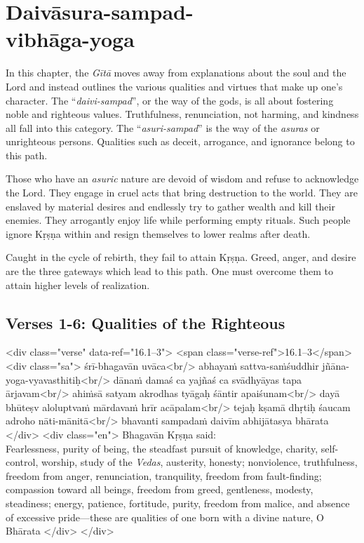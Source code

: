 \chapter{Daivāsura-sampad-\\vibhāga-yoga}\label{chap-daivasura-sampad-vibhaga-yoga}
\noindent In this chapter, the \textit{Gītā} moves away from explanations about the soul and the Lord and instead outlines the various qualities and virtues that make up one’s character. The \enquote{\textit{daivi-sampad}}, or the way of the gods, is all about fostering noble and righteous values. Truthfulness, renunciation, not harming, and kindness all fall into this category. The \enquote{\textit{asuri-sampad}} is the way of the \textit{asuras} or unrighteous persons. Qualities such as deceit, arrogance, and ignorance belong to this path.

Those who have an \textit{asuric} nature are devoid of wisdom and refuse to acknowledge the Lord. They engage in cruel acts that bring destruction to the world. They are enslaved by material desires and endlessly try to gather wealth and kill their enemies. They arrogantly enjoy life while performing empty rituals. Such people ignore Kṛṣṇa within and resign themselves to lower realms after death.

Caught in the cycle of rebirth, they fail to attain Kṛṣṇa. Greed, anger, and desire are the three gateways which lead to this path. One must overcome them to attain higher levels of realization.

\section{Verses 1-6: Qualities of the Righteous}\label{sec-verses-1-6-qualities-of-the-righteous}


\begin{html}
<div class="verse" data-ref="16.1–3">
  <span class="verse-ref">16.1–3</span>
  <div class="sa">
    śrī-bhagavān uvāca<br/>
    abhayaṁ sattva-saṁśuddhir jñāna-yoga-vyavasthitiḥ<br/>
    dānaṁ damaś ca yajñaś ca svādhyāyas tapa ārjavam<br/>
    ahiṁsā satyam akrodhas tyāgaḥ śāntir apaiśunam<br/>
    dayā bhūteṣv aloluptvaṁ mārdavaṁ hrīr acāpalam<br/>
    tejaḥ kṣamā dhṛtiḥ śaucam adroho nāti-mānitā<br/>
    bhavanti sampadaṁ daivīm abhijātasya bhārata
  </div>
  <div class="en">
    \hspace*{1em}Bhagavān Kṛṣṇa said: \\ Fearlessness, purity of being, the steadfast pursuit of knowledge, charity, self-control, worship, study of the \textit{Vedas}, austerity, honesty; nonviolence, truthfulness, freedom from anger, renunciation, tranquility, freedom from fault-finding; compassion toward all beings, freedom from greed, gentleness, modesty, steadiness; energy, patience, fortitude, purity, freedom from malice, and absence of excessive pride---these are qualities of one born with a divine nature, O Bhārata
  </div>
</div>
\end{html}



